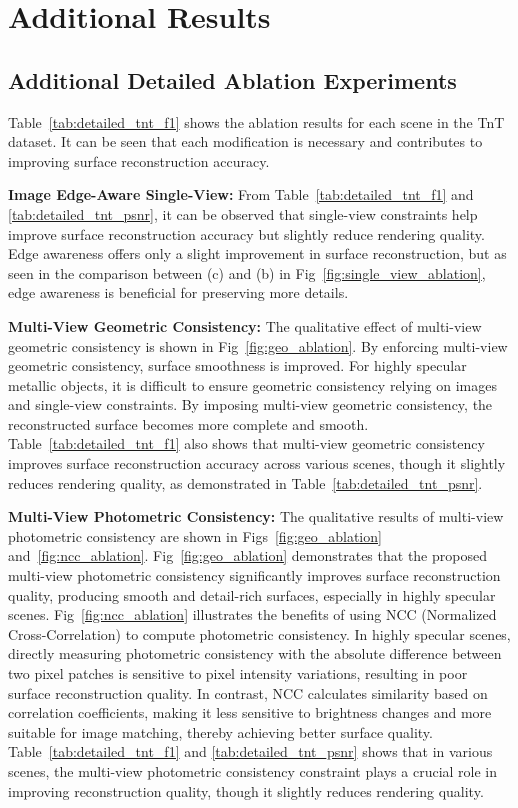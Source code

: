 \section{Additional Results}

\subsection{Additional Detailed Ablation Experiments}

Table~\ref{tab:detailed_tnt_f1} shows the ablation results for each scene in the TnT dataset. It can be seen that each modification is necessary and contributes to improving surface reconstruction accuracy.

\textbf{Image Edge-Aware Single-View:}
From Table~\ref{tab:detailed_tnt_f1} and \ref{tab:detailed_tnt_psnr}, it can be observed that single-view constraints help improve surface reconstruction accuracy but slightly reduce rendering quality. Edge awareness offers only a slight improvement in surface reconstruction, but as seen in the comparison between (c) and (b) in Fig~\ref{fig:single_view_ablation}, edge awareness is beneficial for preserving more details.

\textbf{Multi-View Geometric Consistency:}
The qualitative effect of multi-view geometric consistency is shown in Fig~\ref{fig:geo_ablation}. By enforcing multi-view geometric consistency, surface smoothness is improved. For highly specular metallic objects, it is difficult to ensure geometric consistency relying on images and single-view constraints. By imposing multi-view geometric consistency, the reconstructed surface becomes more complete and smooth. Table~\ref{tab:detailed_tnt_f1} also shows that multi-view geometric consistency improves surface reconstruction accuracy across various scenes, though it slightly reduces rendering quality, as demonstrated in Table~\ref{tab:detailed_tnt_psnr}.

\textbf{Multi-View Photometric Consistency:}
The qualitative results of multi-view photometric consistency are shown in Figs~\ref{fig:geo_ablation} and~\ref{fig:ncc_ablation}. Fig~\ref{fig:geo_ablation} demonstrates that the proposed multi-view photometric consistency significantly improves surface reconstruction quality, producing smooth and detail-rich surfaces, especially in highly specular scenes. Fig~\ref{fig:ncc_ablation} illustrates the benefits of using NCC (Normalized Cross-Correlation) to compute photometric consistency. In highly specular scenes, directly measuring photometric consistency with the absolute difference between two pixel patches is sensitive to pixel intensity variations, resulting in poor surface reconstruction quality. In contrast, NCC calculates similarity based on correlation coefficients, making it less sensitive to brightness changes and more suitable for image matching, thereby achieving better surface quality. Table~\ref{tab:detailed_tnt_f1} and \ref{tab:detailed_tnt_psnr} shows that in various scenes, the multi-view photometric consistency constraint plays a crucial role in improving reconstruction quality, though it slightly reduces rendering quality.


